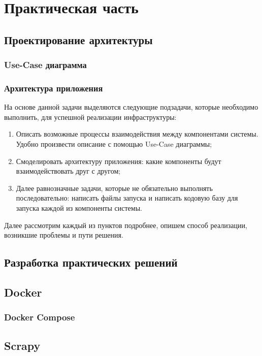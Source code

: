 \chapter{Практическая часть}
\label{cha:ch_2}

\section{Проектирование архитектуры}
\subsection{Use-Case диаграмма}
\subsection{Архитектура приложения}
На основе данной задачи выделяются следующие подзадачи, которые необходимо
выполнить, для успешной реализации инфраструктуры:
\begin{enumerate}[label=\arabic*.]
    \item Описать возможные процессы взаимодействия между компонентами системы.
        Удобно произвести описание с помощью Use-Case диаграммы;
    \item Смоделировать архитектуру приложения: какие компоненты будут
        взаимодействовать друг с другом;
    \item Далее равнозначные задачи, которые не обязательно выполнять
        последовательно: написать файлы запуска и написать кодовую базу для
        запуска каждой из компоненты системы.
\end{enumerate}

Далее рассмотрим каждый из пунктов подробнее, опишем способ реализации,
возникшие проблемы и пути решения.

\section{Разработка практических решений}
\section{Docker}
\subsection{Docker Compose}
\section{Scrapy}
